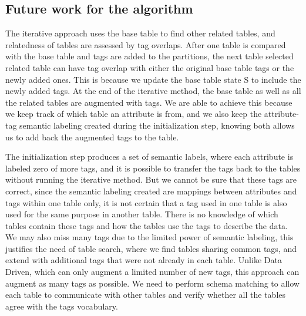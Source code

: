\subsection{Future work for the algorithm}
\label{ssec:FutureWorkForTheAlgorithm}

The iterative approach uses the base table to find other related tables, and relatedness of tables are assessed by tag overlaps. After one table is compared with the base table and tags are added to the partitions, the next table selected related table can have tag overlap with either the original base table tags or the newly added ones. This is because we update the base table state S to include the newly added tags. At the end of the iterative method, the base table as well as all the related tables are augmented with tags. We are able to achieve this because we keep track of which table an attribute is from, and we also keep the attribute-tag semantic labeling created during the initialization step, knowing both allows us to add back the augmented tags to the table.

The initialization step produces a set of semantic labels, where each attribute is labeled zero of more tags, and it is possible to transfer the tags back to the tables without running the iterative method. But we cannot be sure that these tags are correct, since the semantic labeling created are mappings between attributes and tags within one table only, it is not certain that a tag used in one table is also used for the same purpose in another table. There is no knowledge of which tables contain these tags and how the tables use the tags to describe the data. We may also miss many tags due to the limited power of semantic labeling, this justifies the need of table search, where we find tables sharing common tags, and extend with additional tags that were not already in each table. Unlike Data Driven, which can only augment a limited number of new tags, this approach can augment as many tags as possible. We need to perform schema matching to allow each table to communicate with other tables and verify whether all the tables agree with the tags vocabulary.

